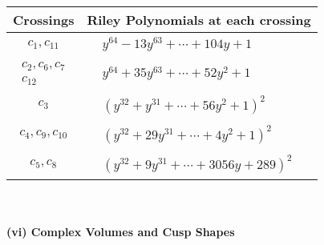 \documentclass[1p]{elsarticle_modified}
\theoremstyle{definition}
\begin{document}
\begin{tabular}{m{50pt}|m{274pt}}
Crossings & \hspace{64pt}Riley Polynomials at each crossing \\
\hline $$\begin{aligned}c_{1},c_{11}\end{aligned}$$&$\begin{aligned}
&y^{64}-13 y^{63}+\cdots+104 y+1
\end{aligned}$\\
\hline $$\begin{aligned}c_{2},c_{6},c_{7}\\c_{12}\end{aligned}$$&$\begin{aligned}
&y^{64}+35 y^{63}+\cdots+52 y^2+1
\end{aligned}$\\
\hline $$\begin{aligned}c_{3}\end{aligned}$$&$\begin{aligned}
&(y^{32}+y^{31}+\cdots+56 y^2+1)^{2}
\end{aligned}$\\
\hline $$\begin{aligned}c_{4},c_{9},c_{10}\end{aligned}$$&$\begin{aligned}
&(y^{32}+29 y^{31}+\cdots+4 y^2+1)^{2}
\end{aligned}$\\
\hline $$\begin{aligned}c_{5},c_{8}\end{aligned}$$&$\begin{aligned}
&(y^{32}+9 y^{31}+\cdots+3056 y+289)^{2}
\end{aligned}$\\
\hline
\end{tabular}\\~\\
\newpage\flushleft \textbf{(vi) Complex Volumes and Cusp Shapes}
\end{document}
